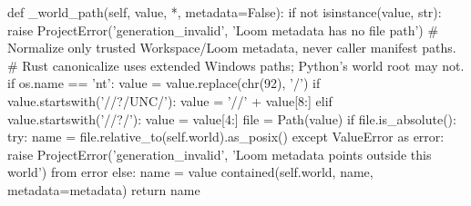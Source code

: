     def _world_path(self, value, *, metadata=False):
        if not isinstance(value, str):
            raise ProjectError('generation_invalid', 'Loom metadata has no file path')
        # Normalize only trusted Workspace/Loom metadata, never caller manifest paths.
        # Rust canonicalize uses extended Windows paths; Python's world root may not.
        if os.name == 'nt':
            value = value.replace(chr(92), '/')
            if value.startswith('//?/UNC/'):
                value = '//' + value[8:]
            elif value.startswith('//?/'):
                value = value[4:]
        file = Path(value)
        if file.is_absolute():
            try:
                name = file.relative_to(self.world).as_posix()
            except ValueError as error:
                raise ProjectError('generation_invalid', 'Loom metadata points outside this world') from error
        else:
            name = value
        contained(self.world, name, metadata=metadata)
        return name

